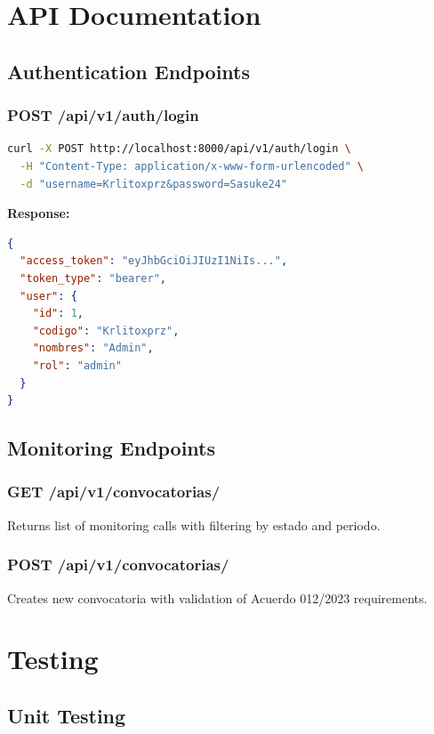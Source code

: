 \documentclass[12pt,a4paper]{report}
\begin{document}
\chapter{API Documentation}

\section{Authentication Endpoints}

\subsection{POST /api/v1/auth/login}
\begin{lstlisting}[language=bash]
curl -X POST http://localhost:8000/api/v1/auth/login \
  -H "Content-Type: application/x-www-form-urlencoded" \
  -d "username=Krlitoxprz&password=Sasuke24"
\end{lstlisting}

\textbf{Response:}
\begin{lstlisting}[language=json]
{
  "access_token": "eyJhbGciOiJIUzI1NiIs...",
  "token_type": "bearer",
  "user": {
    "id": 1,
    "codigo": "Krlitoxprz",
    "nombres": "Admin",
    "rol": "admin"
  }
}
\end{lstlisting}

\section{Monitoring Endpoints}

\subsection{GET /api/v1/convocatorias/}
Returns list of monitoring calls with filtering by estado and periodo.

\subsection{POST /api/v1/convocatorias/}
Creates new convocatoria with validation of Acuerdo 012/2023 requirements.

\chapter{Testing}

\section{Unit Testing}
\end{document}

